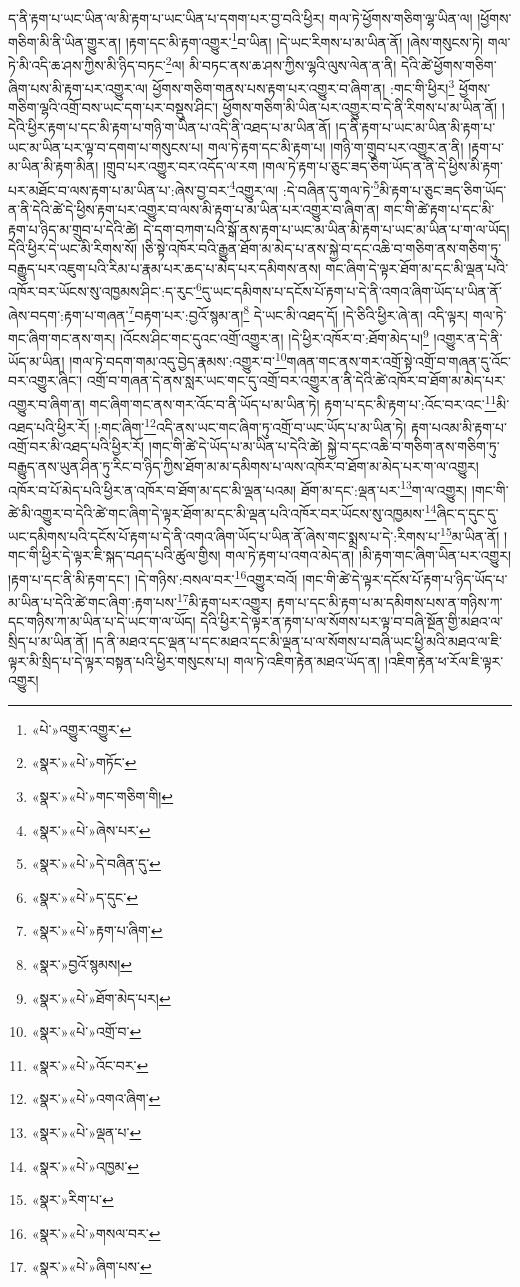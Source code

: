 ད་ནི་རྟག་པ་ཡང་ཡིན་ལ་མི་རྟག་པ་ཡང་ཡིན་པ་དགག་པར་བྱ་བའི་ཕྱིར། གལ་ཏེ་ཕྱོགས་གཅིག་ལྷ་ཡིན་ལ། །ཕྱོགས་གཅིག་མི་ནི་ཡིན་གྱུར་ན། །རྟག་དང་མི་རྟག་འགྱུར་\footnote{«པེ་»འགྱུར་འགྱུར་}བ་ཡིན། །དེ་ཡང་རིགས་པ་མ་ཡིན་ནོ། །ཞེས་གསུངས་ཏེ། གལ་ཏེ་མི་འདི་ཆ་ཤས་ཀྱིས་མི་ཉིད་བཏང་\footnote{«སྣར་»«པེ་»གཏོང་}ལ། མི་བཏང་ནས་ཆ་ཤས་ཀྱིས་ལྷའི་ལུས་ལེན་ན་ནི། དེའི་ཚེ་ཕྱོགས་གཅིག་ཞིག་པས་མི་རྟག་པར་འགྱུར་ལ། ཕྱོགས་གཅིག་གནས་པས་རྟག་པར་འགྱུར་བ་ཞིག་ན། :གང་གི་ཕྱིར།\footnote{«སྣར་»«པེ་»གང་གཅིག་གི།} ཕྱོགས་གཅིག་ལྷའི་འགྲོ་བས་ཡང་དག་པར་བསྡུས་ཤིང་། ཕྱོགས་གཅིག་མི་ཡིན་པར་འགྱུར་བ་དེ་ནི་རིགས་པ་མ་ཡིན་ནོ། །དེའི་ཕྱིར་རྟག་པ་དང་མི་རྟག་པ་གཉི་ག་ཡིན་པ་འདི་ནི་འཐད་པ་མ་ཡིན་ནོ། །ད་ནི་རྟག་པ་ཡང་མ་ཡིན་མི་རྟག་པ་ཡང་མ་ཡིན་པར་ལྟ་བ་དགག་པ་གསུངས་པ། གལ་ཏེ་རྟག་དང་མི་རྟག་པ། །གཉི་ག་གྲུབ་པར་འགྱུར་ན་ནི། །རྟག་པ་མ་ཡིན་མི་རྟག་མིན། །གྲུབ་པར་འགྱུར་བར་འདོད་ལ་རག །གལ་ཏེ་རྟག་པ་ཅུང་ཟད་ཅིག་ཡོད་ན་ནི་དེ་ཕྱིས་མི་རྟག་པར་མཐོང་བ་ལས་རྟག་པ་མ་ཡིན་པ་:ཞེས་བྱ་བར་\footnote{«སྣར་»«པེ་»ཞེས་པར་}འགྱུར་ལ། :དེ་བཞིན་དུ་གལ་ཏེ་\footnote{«སྣར་»«པེ་»དེ་བཞིན་དུ་}མི་རྟག་པ་ཅུང་ཟད་ཅིག་ཡོད་ན་ནི་དེའི་ཚེ་དེ་ཕྱིས་རྟག་པར་འགྱུར་བ་ལས་མི་རྟག་པ་མ་ཡིན་པར་འགྱུར་བ་ཞིག་ན། གང་གི་ཚེ་རྟག་པ་དང་མི་རྟག་པ་ཉིད་མ་གྲུབ་པ་དེའི་ཚེ། དེ་དག་བཀག་པའི་སྒོ་ནས་རྟག་པ་ཡང་མ་ཡིན་མི་རྟག་པ་ཡང་མ་ཡིན་པ་ག་ལ་ཡོད། དེའི་ཕྱིར་དེ་ཡང་མི་རིགས་སོ། །ཅི་སྟེ་འཁོར་བའི་རྒྱུན་ཐོག་མ་མེད་པ་ནས་སྐྱེ་བ་དང་འཆི་བ་གཅིག་ནས་གཅིག་ཏུ་བརྒྱུད་པར་འཇུག་པའི་རིམ་པ་རྣམ་པར་ཆད་པ་མེད་པར་དམིགས་ནས། གང་ཞིག་དེ་ལྟར་ཐོག་མ་དང་མི་ལྡན་པའི་འཁོར་བར་ཡོངས་སུ་འཁྱམས་ཤིང་:ད་རུང་\footnote{«སྣར་»«པེ་»ད་དུང་}དུ་ཡང་དམིགས་པ་དངོས་པོ་རྟག་པ་དེ་ནི་འགའ་ཞིག་ཡོད་པ་ཡིན་ནོ་ཞེས་བདག་:རྟག་པ་གཞན་\footnote{«སྣར་»«པེ་»རྟག་པ་ཞིག་}བརྟག་པར་:བྱའོ་སྙམ་ན།\footnote{«སྣར་»བྱའོ་སྙམས།} དེ་ཡང་མི་འཐད་དོ། །དེ་ཅིའི་ཕྱིར་ཞེ་ན། འདི་ལྟར། གལ་ཏེ་གང་ཞིག་གང་ནས་གར། །འོངས་ཤིང་གང་དུའང་འགྲོ་འགྱུར་ན། །དེ་ཕྱིར་འཁོར་བ་:ཐོག་མེད་པ།\footnote{«སྣར་»«པེ་»ཐོག་མེད་པར།} །འགྱུར་ན་དེ་ནི་ཡོད་མ་ཡིན། །གལ་ཏེ་བདག་གམ་འདུ་བྱེད་རྣམས་:འགྱུར་བ་\footnote{«སྣར་»«པེ་»འགྲོ་བ་}གཞན་གང་ནས་གར་འགྲོ་སྟེ་འགྲོ་བ་གཞན་དུ་འོང་བར་འགྱུར་ཞིང་། འགྲོ་བ་གཞན་དེ་ནས་སླར་ཡང་གང་དུ་འགྲོ་བར་འགྱུར་ན་ནི་དེའི་ཚེ་འཁོར་བ་ཐོག་མ་མེད་པར་འགྱུར་བ་ཞིག་ན། གང་ཞིག་གང་ནས་གར་འོང་བ་ནི་ཡོད་པ་མ་ཡིན་ཏེ། རྟག་པ་དང་མི་རྟག་པ་:འོང་བར་འང་\footnote{«སྣར་»«པེ་»འོང་བར་}མི་འཐད་པའི་ཕྱིར་རོ། །:གང་ཞིག་\footnote{«སྣར་»«པེ་»འགའ་ཞིག་}འདི་ནས་ཡང་གང་ཞིག་ཏུ་འགྲོ་བ་ཡང་ཡོད་པ་མ་ཡིན་ཏེ། རྟག་པའམ་མི་རྟག་པ་འགྲོ་བར་མི་འཐད་པའི་ཕྱིར་རོ། །གང་གི་ཚེ་དེ་ཡོད་པ་མ་ཡིན་པ་དེའི་ཚེ། སྐྱེ་བ་དང་འཆི་བ་གཅིག་ནས་གཅིག་ཏུ་བརྒྱུད་ནས་ཡུན་ཤིན་ཏུ་རིང་བ་ཉིད་ཀྱིས་ཐོག་མ་མ་དམིགས་པ་ལས་འཁོར་བ་ཐོག་མ་མེད་པར་ག་ལ་འགྱུར། འཁོར་བ་པོ་མེད་པའི་ཕྱིར་ན་འཁོར་བ་ཐོག་མ་དང་མི་ལྡན་པའམ། ཐོག་མ་དང་:ལྡན་པར་\footnote{«སྣར་»«པེ་»ལྡན་པ་}ག་ལ་འགྱུར། །གང་གི་ཚེ་མི་འགྱུར་བ་དེའི་ཚེ་གང་ཞིག་དེ་ལྟར་ཐོག་མ་དང་མི་ལྡན་པའི་འཁོར་བར་ཡོངས་སུ་འཁྱམས་\footnote{«སྣར་»«པེ་»འཁྱམ་}ཞིང་ད་དུང་དུ་ཡང་དམིགས་པའི་དངོས་པོ་རྟག་པ་དེ་ནི་འགའ་ཞིག་ཡོད་པ་ཡིན་ནོ་ཞེས་གང་སྨྲས་པ་དེ་:རིགས་པ་\footnote{«སྣར་»རིག་པ་}མ་ཡིན་ནོ། །གང་གི་ཕྱིར་དེ་ལྟར་ཇི་སྐད་བཤད་པའི་ཚུལ་གྱིས། གལ་ཏེ་རྟག་པ་འགའ་མེད་ན། །མི་རྟག་གང་ཞིག་ཡིན་པར་འགྱུར། །རྟག་པ་དང་ནི་མི་རྟག་དང་། །དེ་གཉིས་:བསལ་བར་\footnote{«སྣར་»«པེ་»གསལ་བར་}འགྱུར་བའོ། །གང་གི་ཚེ་དེ་ལྟར་དངོས་པོ་རྟག་པ་ཉིད་ཡོད་པ་མ་ཡིན་པ་དེའི་ཚེ་གང་ཞིག་:རྟག་པས་\footnote{«སྣར་»«པེ་»ཞིག་པས་}མི་རྟག་པར་འགྱུར། རྟག་པ་དང་མི་རྟག་པ་མ་དམིགས་པས་ན་གཉིས་ཀ་དང་གཉིས་ཀ་མ་ཡིན་པ་དེ་ཡང་ག་ལ་ཡོད། དེའི་ཕྱིར་དེ་ལྟར་ན་རྟག་པ་ལ་སོགས་པར་ལྟ་བ་བཞི་སྔོན་གྱི་མཐའ་ལ་སྲིད་པ་མ་ཡིན་ནོ། །ད་ནི་མཐའ་དང་ལྡན་པ་དང་མཐའ་དང་མི་ལྡན་པ་ལ་སོགས་པ་བཞི་ཡང་ཕྱི་མའི་མཐའ་ལ་ཇི་ལྟར་མི་སྲིད་པ་དེ་ལྟར་བསྟན་པའི་ཕྱིར་གསུངས་པ། གལ་ཏེ་འཇིག་རྟེན་མཐའ་ཡོད་ན། །འཇིག་རྟེན་ཕ་རོལ་ཇི་ལྟར་འགྱུར། 